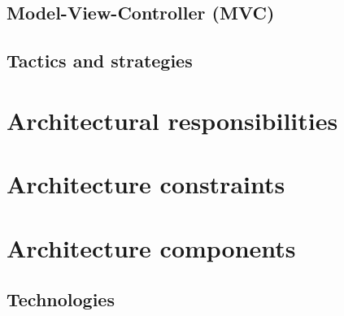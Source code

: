 \documentclass[a4paper,12pt,titlepage]{article}
\begin{document}
	\subsection{Model-View-Controller (MVC)}
	

	\subsection{Tactics and strategies}
	
\section{Architectural responsibilities}
\section{Architecture constraints}

%
\section{Architecture components}
	\subsection{Technologies}
	
\end{document}
